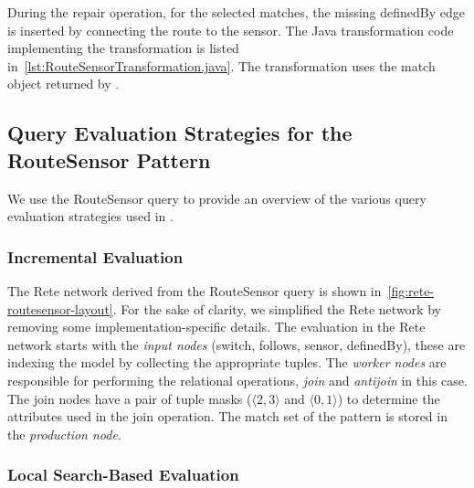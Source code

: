 \documentclass[submission,copyright,creativecommons]{eptcs}
\begin{document}


During the \textsf{repair} operation, for the selected matches, the missing \textsf{definedBy} edge is inserted by connecting the
route to the sensor. The Java transformation code implementing the transformation is listed in~\autoref{lst:RouteSensorTransformation.java}. The transformation uses the match object returned by \eiq.



\subsection{Query Evaluation Strategies for the \textsf{RouteSensor} Pattern}

We use the \textsf{RouteSensor} query to provide an overview of the various query evaluation strategies used in \eiq.

\subsubsection{Incremental Evaluation}

The Rete network derived from the \textsf{RouteSensor} query is shown in~\autoref{fig:rete-routesensor-layout}. For the sake of clarity, we simplified the Rete network by removing some implementation-specific details. The evaluation in the Rete network starts with the \emph{input nodes} (\textsf{switch}, \textsf{follows}, \textsf{sensor}, \textsf{definedBy}), these are indexing the model by collecting the appropriate tuples. The \emph{worker nodes} are responsible for performing the relational operations, \emph{join} and \emph{antijoin} in this case. The join nodes have a pair of tuple masks (\eg $\langle 2, 3 \rangle$ and $\langle 0, 1 \rangle$) to determine the attributes used in the join operation. The match set of the pattern is stored in the \emph{production node}.

\subsubsection{Local Search-Based Evaluation}
\end{document}

